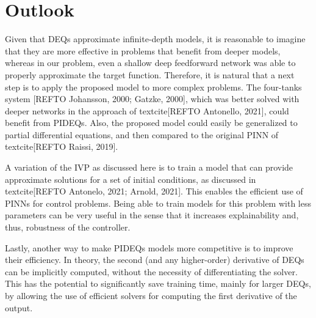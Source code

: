 
\section{Outlook}

Given that \gls{DEQ}s approximate infinite-depth models, it is reasonable to imagine that they are more effective in problems that benefit from deeper models, whereas in our problem, even a shallow deep feedforward network was able to properly approximate the target function.
Therefore, it is natural that a next step is to apply the proposed model to more complex problems.
The four-tanks system [REFTO Johansson, 2000; Gatzke, 2000], which was better solved with deeper networks in the approach of textcite[REFTO Antonello, 2021], could benefit from \glspl{PIDEQ}.
Also, the proposed model could easily be generalized to partial differential equations, and then compared to the original \gls{PINN} of textcite[REFTO Raissi, 2019].

A variation of the \gls{IVP} as discussed here is to train a model that can provide approximate solutions for a set of initial conditions, as discussed in textcite[REFTO Antonelo, 2021; Arnold, 2021].
This enables the efficient use of \glspl{PINN} for control problems.
Being able to train models for this problem with less parameters can be very useful in the sense that it increases explainability and, thus, robustness of the controller.

Lastly, another way to make \glspl{PIDEQ} models more competitive is to improve their efficiency.
In theory, the second (and any higher-order) derivative of \glspl{DEQ} can be implicitly computed, without the necessity of differentiating the solver.
This has the potential to significantly save training time, mainly for larger \glspl{DEQ}, by allowing the use of efficient solvers for computing the first derivative of the output.

